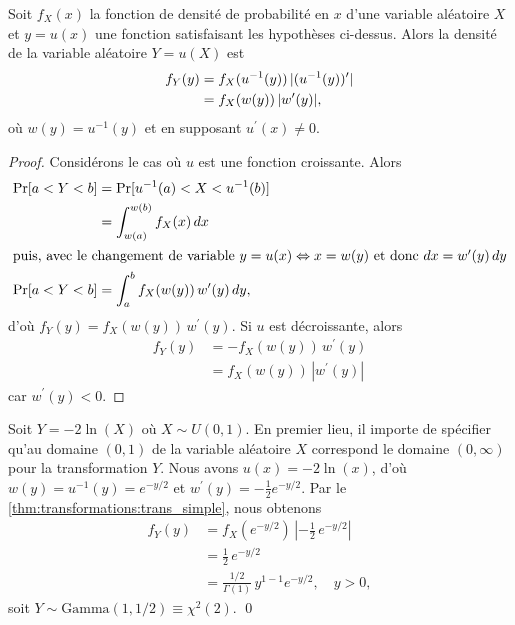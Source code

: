 \begin{thm}
  \label{thm:transformations:trans_simple}
  Soit $f_X(x)$ la fonction de densité de probabilité en $x$ d'une
  variable aléatoire $X$ et $y = u(x)$ une fonction satisfaisant les
  hypothèses ci-dessus. Alors la densité de la variable aléatoire $Y =
  u(X)$ est
  \begin{align*}
    f_Y(y)
    &= f_X(u^{-1}(y))\, \lvert (u^{-1}(y))^\prime \rvert \\
    &= f_X(w(y))\, \lvert w^\prime(y) \rvert,
  \end{align*}
  où $w(y) = u^{-1}(y)$ et en supposant $u^\prime(x) \neq 0$.
\end{thm}
\begin{proof}
  Considérons le cas où $u$ est une fonction croissante. Alors
  \begin{align*}
    \operatorname{Pr} [ a < Y < b ]
    &= \operatorname{Pr} [ u^{-1}(a) < X < u^{-1}(b) ] \\
    &= \int_{w(a)}^{w(b)} f_X(x)\, dx \\
    \intertext{puis, avec le changement de variable $y = u(x)
      \Leftrightarrow x = w(y)$ et donc $dx = w^\prime(y)\, dy$}
    \operatorname{Pr} [ a < Y < b ]
    &= \int_a^b f_X(w(y))\, w^\prime(y)\, dy,
  \end{align*}
  d'où $f_Y(y) = f_X(w(y))\, w^\prime(y)$. Si $u$ est décroissante,
  alors
  \begin{align*}
    f_Y(y)
    &= - f_X(w(y))\, w^\prime(y) \\
    &= f_X(w(y))\, |w^\prime(y)|
  \end{align*}
  car $w^\prime(y) < 0$.
\end{proof}

\begin{exemple}
  Soit $Y = -2 \ln(X)$ où $X \sim U(0, 1)$. En premier
  lieu, il importe de spécifier qu'au domaine $(0, 1)$ de la variable
  aléatoire $X$ correspond le domaine $(0, \infty)$ pour la
  transformation $Y$. Nous avons $u(x) = -2 \ln(x)$, d'où $w(y) = u^{-1}(y)
  = e^{-y/2}$ et $w^\prime(y) = -\frac{1}{2} e^{-y/2}$. Par le
  \autoref{thm:transformations:trans_simple}, nous obtenons
  \begin{align*}
    f_Y(y)
    &= f_X(e^{-y/2})\,
    \left|
      - \frac{1}{2}\, e^{-y/2}
    \right| \\
    &= \frac{1}{2}\, e^{-y/2} \\
    &= \frac{1/2}{\Gamma(1)}\, y^{1 - 1} e^{-y/2}, \quad y > 0,
  \end{align*}
  soit $Y \sim \text{Gamma}(1, 1/2) \equiv \chi^2(2)$.
  \qed
\end{exemple}

